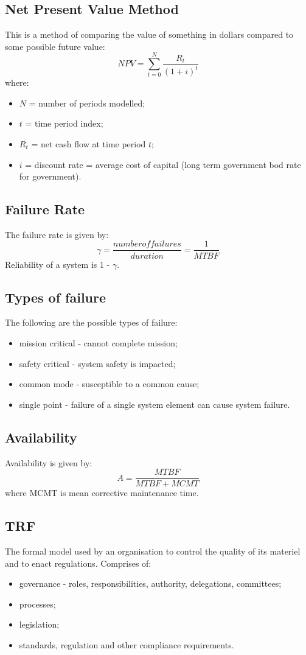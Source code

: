 \documentclass[journal]{IEEEtran}
\begin{document}
\subsection{Net Present Value Method}
This is a method of comparing the value of something in dollars compared to some possible future value:
\[
	NPV = \sum_{t=0}^N\frac{R_t}{(1+i)^t}
\]
where:
\begin{itemize}
	\item $N$ = number of periods modelled;
	\item $t$ = time period index;
	\item $R_t$ = net cash flow at time period $t$;
	\item $i$ = discount rate = average cost of capital (long term  government bod rate for government).
\end{itemize}
\subsection{Failure Rate}
The failure rate is given by:
\[
	\gamma = \frac{number of failures}{duration} = \frac{1}{MTBF}
\]
Reliability of a system is 1 - $\gamma$.
\subsection{Types of failure}
The following are the possible types of failure:
\begin{itemize}
	\item mission critical - cannot complete mission;
	\item safety critical - system safety is impacted;
	\item common mode - susceptible to a common cause;
	\item single point - failure of a single system element can cause system failure.
\end{itemize}
\subsection{Availability}
Availability is given by:
\[
	A = \frac{MTBF}{MTBF+MCMT}
\]
where MCMT is mean corrective maintenance time.
\subsection{TRF}
The formal model used by an organisation to control the quality of its materiel and to enact regulations. Comprises of:
\begin{itemize}
	\item governance - roles, responsibilities, authority, delegations, committees;
	\item processes;
	\item legislation;
	\item standards, regulation and other compliance requirements.
\end{itemize}
\end{document}

